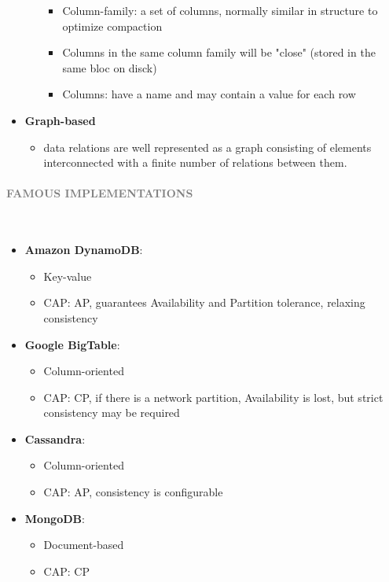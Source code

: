 \documentclass[10pt,a4paper]{article}
\newcommand{\myparagraph}[1]{\paragraph{\normalsize{\textcolor{gray}{\uppercase{\textbf{#1}}}} }\mbox{} \vspace{0.5em}\\}
\begin{document}
\begin{itemize}
\begin{itemize}
\begin{itemize}
			\item Column-family: a set of columns, normally similar in structure to optimize compaction
			\item Columns in the same column family will be "close" (stored in the same bloc on disck)
			\item Columns: have a name and may contain a value for each row
		\end{itemize}
	\end{itemize}
	\item \textbf{Graph-based}
	 \begin{itemize}
	 	\item data relations are well represented as a graph consisting of elements interconnected with a finite number of relations between them.
	 \end{itemize}
\end{itemize}
\myparagraph{Famous Implementations}
\begin{itemize}
	\item \textbf{Amazon DynamoDB}:
	\begin{itemize}
		\item Key-value
		\item CAP: AP, guarantees Availability and Partition tolerance, relaxing consistency
	\end{itemize}
	\item \textbf{Google BigTable}:
	\begin{itemize}
		\item Column-oriented
		\item CAP: CP, if there is a network partition, Availability is lost, but strict consistency may be required
	\end{itemize}
	\item \textbf{Cassandra}:
	\begin{itemize}
		\item Column-oriented
		\item CAP: AP, consistency is configurable
	\end{itemize}
	\item \textbf{MongoDB}:
	\begin{itemize}
		\item Document-based
		\item CAP: CP
	\end{itemize}
\end{itemize}
\end{document}
